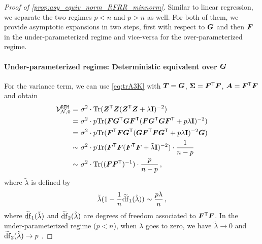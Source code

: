 \begin{proof}[Proof of \cref{prop:asy_equiv_norm_RFRR_minnorm}]
Similar to linear regression, we separate the two regimes $p<n$ and $p>n$ as well. For both of them, we provide asymptotic expansions in two steps, first with respect to ${\boldsymbol G}$ and then ${\boldsymbol F}$ in the under-parameterized regime and vice-versa for the over-parameterized regime.
\paragraph{Under-parameterized regime: Deterministic equivalent over ${\boldsymbol G}$} For the variance term, we can use \cref{eq:trA3K} with ${\boldsymbol T}={\boldsymbol G}$, ${\boldsymbol \Sigma}={\boldsymbol F}^{\mathsf T}{\boldsymbol F}$, ${\boldsymbol A}={\boldsymbol F}^{\mathsf T}{\boldsymbol F}$ and obtain
\[
\begin{aligned}
\mathcal{V}_{\mathcal{N},0}^{\tt RFM} =&~ \sigma^2 \cdot {\rm Tr}({\boldsymbol Z}^{\mathsf T} {\boldsymbol Z}({\boldsymbol Z}^{\mathsf T} {\boldsymbol Z} + \lambda{\mathbf I})^{-2})\\
=&~ \sigma^2 \cdot p{\rm Tr}({\boldsymbol F}{\boldsymbol G}^{\mathsf T} {\boldsymbol G} {\boldsymbol F}^{\mathsf T}({\boldsymbol F}{\boldsymbol G}^{\mathsf T} {\boldsymbol G} {\boldsymbol F}^{\mathsf T} + p\lambda{\mathbf I})^{-2})\\
=&~ \sigma^2 \cdot p{\rm Tr}({\boldsymbol F}^{\mathsf T} {\boldsymbol F}{\boldsymbol G}^{\mathsf T} ( {\boldsymbol G} {\boldsymbol F}^{\mathsf T} {\boldsymbol F} {\boldsymbol G}^{\mathsf T} + p\lambda{\mathbf I})^{-2}{\boldsymbol G} )\\
\sim&~ \sigma^2 \cdot p{\rm Tr}({\boldsymbol F}^{\mathsf T} {\boldsymbol F} ( {\boldsymbol F}^{\mathsf T} {\boldsymbol F} + \tilde\lambda{\mathbf I})^{-2} ) \cdot \frac{1}{n-p}\\
\sim&~ \sigma^2 \cdot {\rm Tr}(( {\boldsymbol F} {\boldsymbol F}^{\mathsf T} )^{-1}) \cdot \frac{p}{n-p}\,,\\
\end{aligned}
\]
where $\tilde\lambda$ is defined by
\begin{equation}\label{eq:tilde_lambda}
    \tilde\lambda(1-\frac{1}{n}\widetilde{\rm df}_1(\tilde\lambda)) \sim \frac{p\lambda}{n}\,,
\end{equation}
where $\widetilde{\rm df}_1(\tilde\lambda)$ and $\widetilde{\rm df}_2(\tilde\lambda)$ are degrees of freedom associated to ${\boldsymbol F}^{\mathsf T} {\boldsymbol F}$. In the under-parameterized regime ($p<n$), when $\lambda$ goes to zero, we have $\tilde\lambda \to 0$ and  $\widetilde{\rm df}_2(\tilde\lambda) \to p$ \citep{bach2024high}.


\end{proof}
